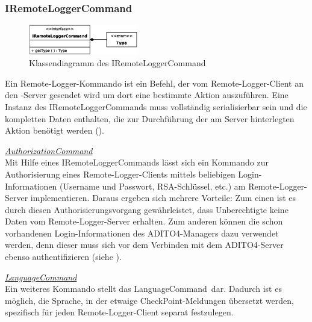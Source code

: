 \subsubsection{IRemoteLoggerCommand}\label{sec:IRemoteLoggerCommand}
\vspace{-2px}
\begin{figure}
	\vspace{-10px} \hspace{5px}
	\includegraphics[width=180px]{../img/CD-IRemoteLoggerCommand.eps}
	\caption{Klassendiagramm des \glqq IRemoteLoggerCommand\grqq}
\end{figure}
\par Ein Remote-Logger-Kommando ist ein Befehl, der vom Remote-Logger-Client an den -Server gesendet wird um dort eine bestimmte Aktion auszuführen. Eine Instanz des IRemoteLoggerCommands muss vollständig serialisierbar sein und die kompletten Daten enthalten, die zur Durchführung der am Server hinterlegten Aktion benötigt werden ().
\vspace{-2px}
\par \textit{\underline{AuthorizationCommand}}
\vspace{2px}
\\ Mit Hilfe eines IRemoteLoggerCommands lässt sich ein Kommando zur Authorisierung eines Remote-Logger-Clients mittels beliebigen Login-Informationen (Username und Passwort, RSA-Schlüssel, etc.) am Remote-Logger-Server implementieren. Daraus ergeben sich mehrere Vorteile: Zum einen ist es durch diesen Authorisierungsvorgang gewährleistet, dass Unberechtigte keine Daten vom  Remote-Logger-Server erhalten. Zum anderen können die schon vorhandenen Login-Informationen des ADITO4-Managers dazu verwendet werden, denn dieser muss sich vor dem Verbinden mit dem ADITO4-Server ebenso authentifizieren (siehe ).
\vspace{-2px}
\par \textit{\underline{LanguageCommand}}
\vspace{2px}
\\ Ein weiteres Kommando stellt das \glqq LanguageCommand\grqq\ dar. Dadurch ist es möglich, die Sprache, in der etwaige CheckPoint-Meldungen übersetzt werden, spezifisch für jeden Remote-Logger-Client separat festzulegen.

